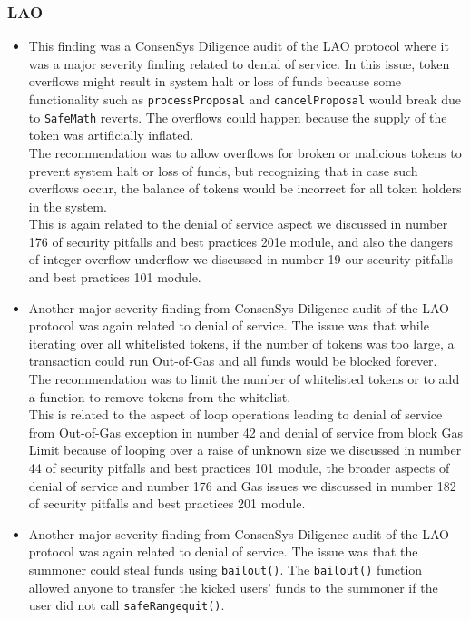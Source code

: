 \subsubsection{LAO}\label{lao}

\begin{itemize}
\item
  This finding was a ConsenSys Diligence audit of the LAO protocol where
  it was a major severity finding related to denial of service. In this
  issue, token overflows might result in system halt or loss of funds
  because some functionality such as \texttt{processProposal} and
  \texttt{cancelProposal} would break due to \texttt{SafeMath} reverts.
  The overflows could happen because the supply of the token was
  artificially inflated.\\

  The recommendation was to allow overflows for broken or malicious
  tokens to prevent system halt or loss of funds, but recognizing that
  in case such overflows occur, the balance of tokens would be incorrect
  for all token holders in the system.\\

  This is again related to the denial of service aspect we discussed in
  number 176 of security pitfalls and best practices 201e module, and
  also the dangers of integer overflow underflow we discussed in number
  19 our security pitfalls and best practices 101 module.
\item
  Another major severity finding from ConsenSys Diligence audit of the
  LAO protocol was again related to denial of service. The issue was
  that while iterating over all whitelisted tokens, if the number of
  tokens was too large, a transaction could run Out-of-Gas and all funds
  would be blocked forever.\\

  The recommendation was to limit the number of whitelisted tokens or to
  add a function to remove tokens from the whitelist.\\

  This is related to the aspect of loop operations leading to denial of
  service from Out-of-Gas exception in number 42 and denial of service
  from block Gas Limit because of looping over a raise of unknown size
  we discussed in number 44 of security pitfalls and best practices 101
  module, the broader aspects of denial of service and number 176 and
  Gas issues we discussed in number 182 of security pitfalls and best
  practices 201 module.
\item
  Another major severity finding from ConsenSys Diligence audit of the
  LAO protocol was again related to denial of service. The issue was
  that the summoner could steal funds using \texttt{bailout()}. The
  \texttt{bailout()} function allowed anyone to transfer the kicked
  users' funds to the summoner if the user did not call
  \texttt{safeRangequit()}.\\


\end{itemize}
